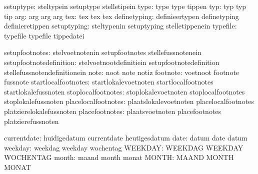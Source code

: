                     setuptype:  steltypein                   setuptype
                                stelletipein
                         type:  type                         type
                                tippen
                          typ:  typ                          typ
                                tip
                          arg:  arg                          arg
                                arg
                          tex:  tex                          tex
                                tex
                 definetyping:  definieertypen               definetyping
                                definieretippen
                  setuptyping:  steltypenin                  setuptyping
                                stelletippenein
                     typefile:  typefile                     typefile
                                tippedatei

               setupfootnotes:  stelvoetnotenin              setupfootnotes
                                stellefussnotenein
      setupfootnotedefinition:  stelvoetnootdefinitiein      setupfootnotedefinition
                                stellefussnotendefinitionein
                         note:  noot                         note
                                notiz
                     footnote:  voetnoot                     footnote
                                fussnote
          startlocalfootnotes:  startlokalevoetnoten         startlocalfootnotes
                                startlokalefussnoten
           stoplocalfootnotes:  stoplokalevoetnoten          stoplocalfootnotes
                                stoplokalefussnoten
          placelocalfootnotes:  plaatslokalevoetnoten        placelocalfootnotes
                                platzierelokalefussnoten
               placefootnotes:  plaatsvoetnoten              placefootnotes
                                platzierefussnoten

                  currentdate:  huidigedatum                 currentdate
                                heutigesdatum
                         date:  datum                        date
                                datum
                      weekday:  weekdag                      weekday
                                wochentag
                      WEEKDAY:  WEEKDAG                      WEEKDAY
                                WOCHENTAG
                        month:  maand                        month
                                monat
                        MONTH:  MAAND                        MONTH
                                MONAT

